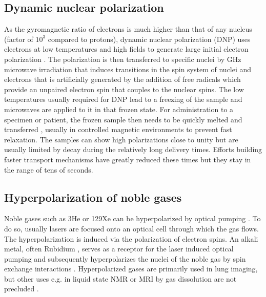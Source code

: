         \subsection{Dynamic nuclear polarization}
        As the gyromagnetic ratio of electrons is much higher than that of any nucleus (factor of $10^{3}$ compared to protons), dynamic nuclear polarization (DNP) uses electrons at low temperatures and high fields to generate large initial electron polarization \cite{berliner_spin_1976}. The polarization is then transferred to specific nuclei by \si{\giga\hertz} microwave irradiation \cite{bajaj_dynamic_2011} that induces transitions in the spin system of nuclei and electrons that is artificially generated by the addition of free radicals which provide an unpaired electron spin that couples to the nuclear spins. The low temperatures usually required for DNP lead to a freezing of the sample and microwaves are applied to it in that frozen state. For administration to a specimen or patient, the frozen sample then needs to be quickly melted and transferred \cite{johannesson_dynamic_2009}, usually in controlled magnetic environments \cite{milani_magnetic_2015} to prevent fast relaxation. The samples can show high polarizations close to unity but are usually limited by decay during the relatively long delivery times. Efforts building faster transport mechanisms have greatly reduced these times but they stay in the range of tens of seconds.
        \subsection{Hyperpolarization of noble gases}
        Noble gases such as 3He or 129Xe can be hyperpolarized by optical pumping \cite{middleton_mr_1995,oros_hyperpolarized_2004}. To do so, usually lasers are focused onto an optical cell through which the gas flows. The hyperpolarization is induced via the polarization of electron spins. An alkali metal, often Rubidium \cite{hersman_large_2008}, serves as a receptor for the laser induced optical pumping and subsequently hyperpolarizes the nuclei of the noble gas by spin exchange interactions \cite{walker_spin-exchange_1997}. Hyperpolarized gases are primarily used in lung imaging, but other uses e.g. in liquid state NMR or MRI by gas dissolution are not precluded \cite{duhamel_xenon-129_2001}.
